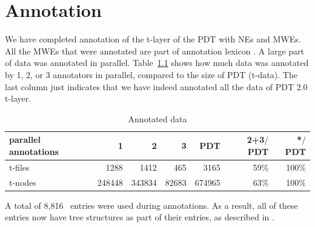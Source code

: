 
\chapter{Annotation}
\label{sec:annot}

%
We have completed annotation of the t-layer of the PDT with NEs and MWEs. All the MWEs that were annotated are part of annotation lexicon \semlex. A large part of data was annotated in parallel. Table~\ref{tab:parallel-anot} shows how much data was annotated by 1, 2, or 3 annotators in parallel, compared to the size of PDT (t-data). The last column just indicates that we have indeed annotated all the data of PDT 2.0 t-layer.
\label{tab:parallel-anot}

\begin{table}[htdp]
\begin{tabular}{l|r|r|r|r|r|r}
 parallel annotations  & 1    & 2    & 3   & PDT    & 2+3$/$PDT & *$/$PDT \\
 \hline
 t-files & 1288   & 1412   & 465   & 3165   & 59\%        & 100\% \\
 t-nodes & 248448 & 343834 & 82683 & 674965 & 63\%        & 100\% \\
\end{tabular}
\caption{Annotated data}
\label{tab:parallel-anot}
\end{table}%

A total of 8,816 \semlex\ entries were used during annotations. As a result, all of these entries now have tree structures as part of their entries, as described in .

